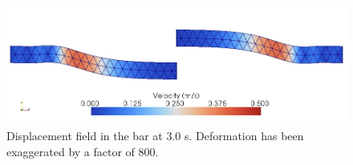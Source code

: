 \noindent \begin{center}
\begin{figure}
\begin{centering}
\includegraphics[scale=0.5]{tutorials/shearwave/figs/tri3deform30}
\par\end{centering}

\caption{Displacement field in the bar at 3.0 s. Deformation has been exaggerated
by a factor of 800.\label{fig:shearwave:tri3:deform}}
\end{figure}

\par\end{center}
